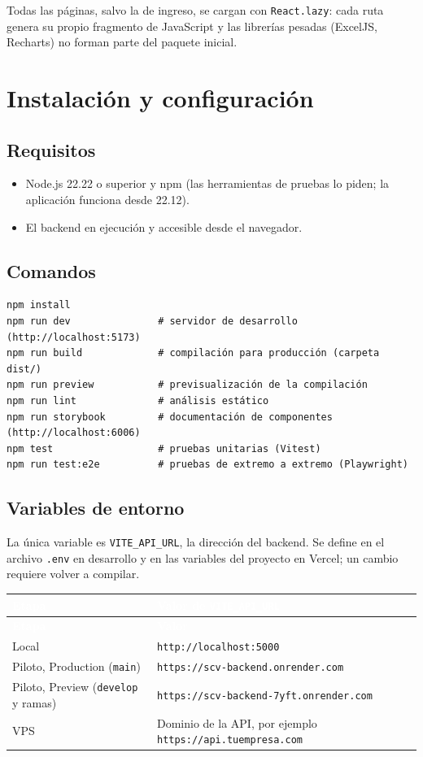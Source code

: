 \documentclass[11pt,letterpaper]{article}
\newcommand{\cabecera}{\rowcolor{maxamPrimario}}
\newcommand{\tth}[1]{\textcolor{white}{\textbf{#1}}}
\newcommand{\code}[1]{\nolinkurl{#1}}
\begin{document}
Todas las páginas, salvo la de ingreso, se cargan con \code{React.lazy}: cada ruta genera su propio fragmento de JavaScript y las librerías pesadas (ExcelJS, Recharts) no forman parte del paquete inicial.

\section{Instalación y configuración}

\subsection{Requisitos}
\begin{itemize}
  \item Node.js 22.22 o superior y npm (las herramientas de pruebas lo piden; la aplicación funciona desde 22.12).
  \item El backend en ejecución y accesible desde el navegador.
\end{itemize}

\subsection{Comandos}
\begin{lstlisting}
npm install
npm run dev               # servidor de desarrollo (http://localhost:5173)
npm run build             # compilación para producción (carpeta dist/)
npm run preview           # previsualización de la compilación
npm run lint              # análisis estático
npm run storybook         # documentación de componentes (http://localhost:6006)
npm test                  # pruebas unitarias (Vitest)
npm run test:e2e          # pruebas de extremo a extremo (Playwright)
\end{lstlisting}

\subsection{Variables de entorno}
La única variable es \code{VITE_API_URL}, la dirección del backend. Se define en el archivo \code{.env} en desarrollo y en las variables del proyecto en Vercel; un cambio requiere volver a compilar.

\begin{xltabular}{\textwidth}{L{3.4cm} Y}
\cabecera \tth{Etapa} & \tth{Valor de \code{VITE_API_URL}} \\
\endfirsthead
\cabecera \tth{Etapa} & \tth{Valor} \\
\endhead
{} Local & \code{http://localhost:5000} \\
Piloto, Production (\code{main}) & \code{https://scv-backend.onrender.com} \\
 Piloto, Preview (\code{develop} y ramas) & \code{https://scv-backend-7yft.onrender.com} \\
VPS & Dominio de la API, por ejemplo \code{https://api.tuempresa.com} \\
\end{xltabular}
\end{document}
